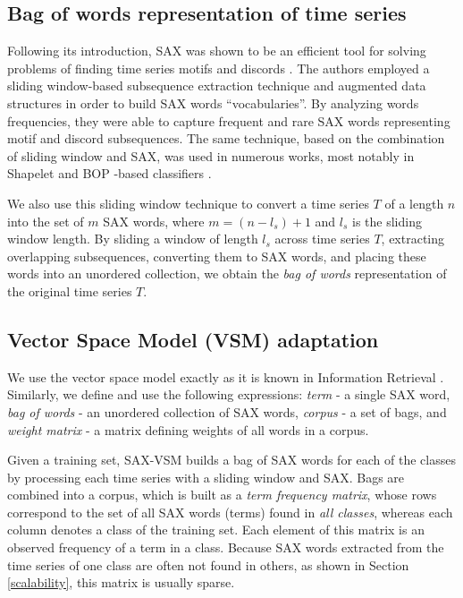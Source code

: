 \documentclass[conference]{IEEEtran}
\begin{document}
\subsection{Bag of words representation of time series} \label{bow_representation}
Following its introduction, SAX was shown to be an efficient tool for solving problems 
of finding time series motifs and discords \cite{hot_sax}.
The authors employed a sliding window-based subsequence extraction technique 
and augmented data structures in order to build SAX words ``vocabularies''.
By analyzing words frequencies, they were able to capture frequent and rare 
SAX words representing motif and discord subsequences. 
The same technique, based on the combination of sliding window and SAX, 
was used in numerous works, most notably in Shapelet \cite{fast-shapelets}
and BOP -based classifiers \cite{bag_patterns}. 

We also use this sliding window technique to convert a time series $T$ of a 
length $n$ into the set of $m$ SAX words, where $m=(n-l_{s})+1$ and $l_{s}$ 
is the sliding window length. 
By sliding a window of length $l_{s}$ across time series $T$, extracting overlapping 
subsequences, converting them to SAX words, and placing these words into an 
unordered collection, we obtain the \textit{bag of words} representation of 
the original time series $T$.

\vspace{-0.1cm}
\subsection{Vector Space Model (VSM) adaptation}
We use the vector space model exactly as it is known in Information Retrieval \cite{salton}. 
Similarly, we define and use the following expressions:
\textit{term} - a single SAX word, 
\textit{bag of words} - an unordered collection of SAX words, 
\textit{corpus} - a set of bags, and 
\textit{weight matrix} - a matrix defining weights of all words in a corpus. 

Given a training set, SAX-VSM builds a bag of SAX words for each of the 
classes by processing each time series with a sliding window and SAX. 
Bags are combined into a corpus, which is built as a 
\textit{term frequency matrix}, whose
rows correspond to the set of all SAX words (terms) found in \textit{all classes}, 
whereas each column denotes a class of the training set. 
Each element of this matrix is an observed frequency of a term in a class. 
Because SAX words extracted from the time series of one class are often not 
found in others, as shown in Section \ref{scalability}, this matrix is usually sparse. 
\end{document}

